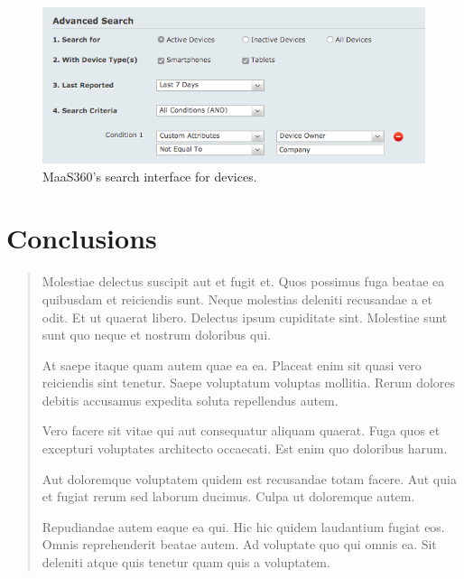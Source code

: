 \documentclass{llncs}
\begin{document}
\begin{figure}\centering
  \includegraphics[width=\linewidth]{figures/maas-groupsearch.png}
  \caption{MaaS360's search interface for devices.}
  \label{fig:maas360search}
\end{figure}

\section{Conclusions}
\label{sec:conclusions}

\begin{quote}
Molestiae delectus suscipit aut et fugit et. Quos possimus fuga beatae ea
quibusdam et reiciendis sunt. Neque molestias deleniti recusandae a et odit. Et
ut quaerat libero. Delectus ipsum cupiditate sint. Molestiae sunt sunt quo
neque et nostrum doloribus qui.

At saepe itaque quam autem quae ea ea. Placeat enim sit quasi vero reiciendis
sint tenetur. Saepe voluptatum voluptas mollitia. Rerum dolores debitis
accusamus expedita soluta repellendus autem.

Vero facere sit vitae qui aut consequatur aliquam quaerat. Fuga quos et
excepturi voluptates architecto occaecati. Est enim quo doloribus harum.

Aut doloremque voluptatem quidem est recusandae totam facere. Aut quia et
fugiat rerum sed laborum ducimus. Culpa ut doloremque autem.

Repudiandae autem eaque ea qui. Hic hic quidem laudantium fugiat eos. Omnis
reprehenderit beatae autem. Ad voluptate quo qui omnis ea. Sit deleniti atque
quis tenetur quam quis a voluptatem.
\end{quote}


{}

\end{document}
